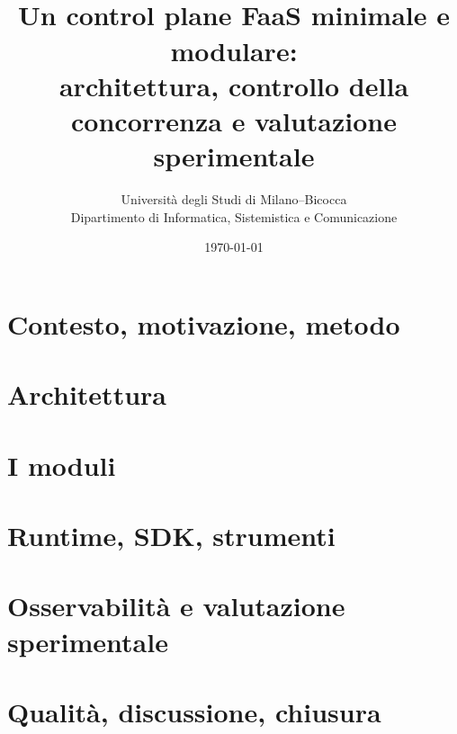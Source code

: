 \documentclass[12pt,a4paper,twoside,openright]{book}
\title{\textbf{\nf}\\[0.4em]\large Un control plane FaaS minimale e modulare:\\ architettura, controllo della concorrenza e valutazione sperimentale}
\author{Universit\`a degli Studi di Milano--Bicocca\\ Dipartimento di Informatica, Sistemistica e Comunicazione}
\date{\today}
\begin{document}
\frontmatter
\maketitle

\tableofcontents

\mainmatter

\part{Contesto, motivazione, metodo}




\part{Architettura}






\part{I moduli}









\part{Runtime, SDK, strumenti}





\part{Osservabilit\`a e valutazione sperimentale}






\part{Qualit\`a, discussione, chiusura}





\appendix








\end{document}
